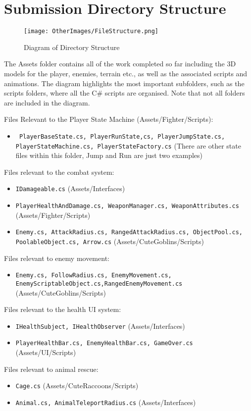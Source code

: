 \documentclass[10pt]{final_report}
\begin{document}
\newpage

\section{Submission Directory Structure}
\begin{figure}[h!]
    \centering
    \texttt{[image: OtherImages/FileStructure.png]}
    \caption{Diagram of Directory Structure}
    \label{fig:label_name2}
\end{figure}
The Assets folder contains all of the work completed so far including the 3D models for the player, enemies, terrain etc., as well as the associated scripts and animations. The diagram highlights the most important subfolders, such as the scripts folders, where all the C\# scripts are organised. Note that not all folders are included in the diagram. \newline

Files Relevant to the Player State Machine (Assets/Fighter/Scripts):
\begin{itemize}
    \item \texttt{ PlayerBaseState.cs, PlayerRunState,cs, PlayerJumpState.cs, PlayerStateMachine.cs, PlayerStateFactory.cs} (There are other state files within this folder, Jump and Run are just two examples)
\end{itemize}

Files relevant to the combat system:
\begin{itemize}
    \item \texttt{IDamageable.cs} (Assets/Interfaces)
    \item \texttt{PlayerHealthAndDamage.cs, WeaponManager.cs, WeaponAttributes.cs} (Assets/Fighter/Scripts)
    \item \texttt{Enemy.cs, AttackRadius.cs, RangedAttackRadius.cs, ObjectPool.cs, PoolableObject.cs, Arrow.cs} (Assets/CuteGoblins/Scripts)
\end{itemize}
Files relevant to enemy movement:
\begin{itemize}
    \item \texttt{Enemy.cs, FollowRadius.cs, EnemyMovement.cs, EnemyScriptableObject.cs,}\newline  \texttt{RangedEnemyMovement.cs} (Assets/CuteGoblins/Scripts)
\end{itemize}
Files relevant to the health UI system:
\begin{itemize}
    \item \texttt{IHealthSubject, IHealthObserver} (Assets/Interfaces)
    \item \texttt{PlayerHealthBar.cs, EnemyHealthBar.cs, GameOver.cs} (Assets/UI/Scripts)
\end{itemize}
Files relevant to animal rescue:
\begin{itemize}
    \item \texttt{Cage.cs} (Assets/CuteRaccoons/Scripts)
    \item \texttt{Animal.cs, AnimalTeleportRadius.cs} (Assets/Interfaces)
\end{itemize}
\end{document}
